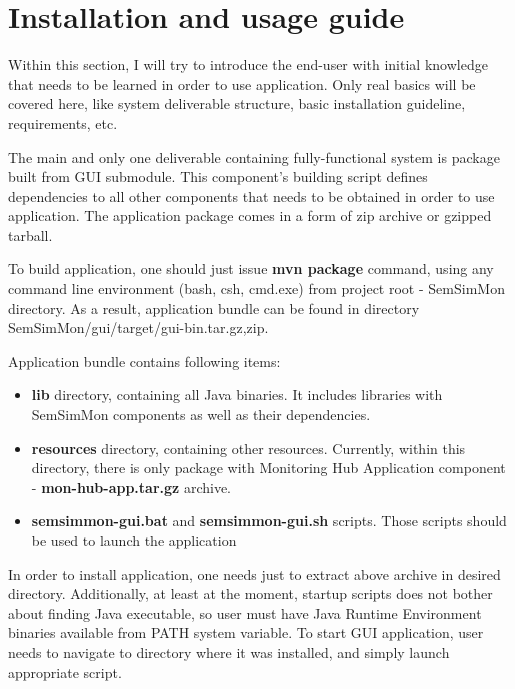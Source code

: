 %


\section{Installation and usage guide}
\label{sec:ch7_working_with}

Within this section, I will try to introduce the end-user with initial knowledge that needs to be learned in order to use application. Only real basics will be covered here, like system deliverable structure, basic installation guideline, requirements, etc.

The main and only one deliverable containing fully-functional system is package built from GUI submodule. This component\rq{}s building script defines dependencies to all other components that needs to be obtained in order to use application. The application package comes in a form of zip archive or gzipped tarball. 

To build application, one should just issue {\bf mvn package} command, using any command line environment (bash, csh, cmd.exe) from project root - SemSimMon directory. As a result, application bundle can be found in directory SemSimMon/gui/target/gui-bin.{tar.gz,zip}.

Application bundle contains following items:
\begin{itemize}
  \item {\bf lib} directory, containing all Java binaries. It includes libraries with SemSimMon components as well as their dependencies.
  \item {\bf resources} directory, containing other resources. Currently, within this directory, there is only package with Monitoring Hub Application component - {\bf mon-hub-app.tar.gz} archive.
  \item {\bf semsimmon-gui.bat} and {\bf semsimmon-gui.sh} scripts. Those scripts should be used to launch the application	
\end{itemize}  

In order to install application, one needs just to extract above archive in desired directory. Additionally, at least at the moment, startup scripts does not bother about finding Java executable, so user must have Java Runtime Environment binaries available from PATH system variable. To start GUI application, user needs to navigate to directory where it was installed, and simply launch appropriate script.


